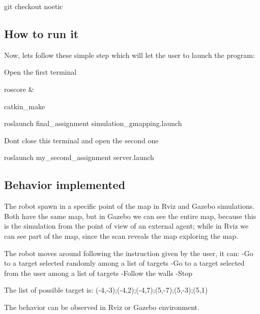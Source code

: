 \begin{DoxyCode}
git checkout noetic
\end{DoxyCode}


\subsection*{How to run it}

Now, let\textquotesingle{}s follow these simple step which will let the user to launch the program\+:

Open the first terminal


\begin{DoxyCode}
roscore &
\end{DoxyCode}



\begin{DoxyCode}
catkin\_make
\end{DoxyCode}



\begin{DoxyCode}
roslaunch final\_assignment simulation\_gmapping.launch
\end{DoxyCode}


Don\textquotesingle{}t close this terminal and open the second one


\begin{DoxyCode}
roslaunch my\_second\_assignment server.launch
\end{DoxyCode}


\subsection*{Behavior implemented}

The robot spawn in a specific point of the map in Rviz and Gazebo simulations. Both have the same map, but in Gazebo we can see the entire map, because this is the simulation from the point of view of an external agent; while in Rviz we can see part of the map, since the scan reveals the map exploring the map.

The robot moves around following the instruction given by the user, it can\+: -\/\+Go to a target selected randomly among a list of targets -\/\+Go to a target selected from the user among a list of targets -\/\+Follow the walls -\/\+Stop

The list of possible target is\+: (-\/4,-\/3);(-\/4,2);(-\/4,7);(5,-\/7);(5,-\/3);(5,1)

The behavior can be observed in Rviz or Gazebo environment.

